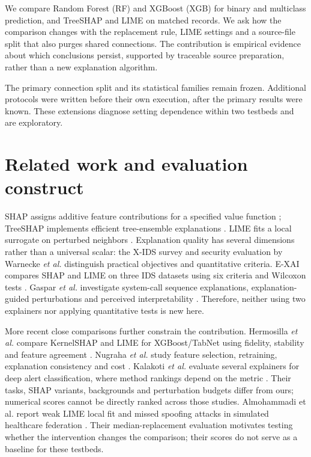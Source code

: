 \documentclass[conference,letterpaper]{IEEEtran}
\begin{document}
We compare Random Forest (RF) \cite{rf} and XGBoost (XGB) \cite{xgb} for binary and multiclass prediction, and TreeSHAP and LIME on matched records. We ask how the comparison changes with the replacement rule, LIME settings and a source-file split that also purges shared connections. The contribution is empirical evidence about which conclusions persist, supported by traceable source preparation, rather than a new explanation algorithm.

The primary connection split and its statistical families remain frozen. Additional protocols were written before their own execution, after the primary results were known. These extensions diagnose setting dependence within two testbeds and are exploratory.

\section{Related work and evaluation construct}
SHAP assigns additive feature contributions for a specified value function \cite{shap}; TreeSHAP implements efficient tree-ensemble explanations \cite{treeshap}. LIME fits a local surrogate on perturbed neighbors \cite{lime}. Explanation quality has several dimensions rather than a universal scalar: the X-IDS survey \cite{neupane} and security evaluation by Warnecke \emph{et al.} \cite{warnecke} distinguish practical objectives and quantitative criteria. E-XAI compares SHAP and LIME on three IDS datasets using six criteria and Wilcoxon tests \cite{exai}. Gaspar \emph{et al.} investigate system-call sequence explanations, explanation-guided perturbations and perceived interpretability \cite{gaspar}. Therefore, neither using two explainers nor applying quantitative tests is new here.

More recent close comparisons further constrain the contribution. Hermosilla \emph{et al.} compare KernelSHAP and LIME for XGBoost/TabNet using fidelity, stability and feature agreement \cite{forensic}. Nugraha \emph{et al.} study feature selection, retraining, explanation consistency and cost \cite{versatile}. Kalakoti \emph{et al.} evaluate several explainers for deep alert classification, where method rankings depend on the metric \cite{kalakoti}. Their tasks, SHAP variants, backgrounds and perturbation budgets differ from ours; numerical scores cannot be directly ranked across those studies. Almohammadi et al. report weak LIME local fit and missed spoofing attacks in simulated healthcare federation \cite{almohammadi}. Their median-replacement evaluation motivates testing whether the intervention changes the comparison; their scores do not serve as a baseline for these testbeds.
\end{document}
